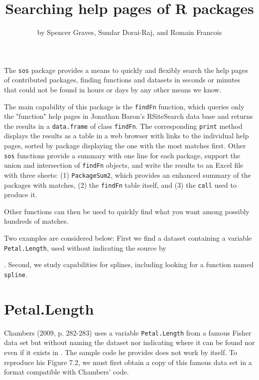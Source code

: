 \title{Searching help pages of R packages}
\author{by Spencer Graves, Sundar Dorai-Raj, and Romain Francois}

\maketitle

The {\tt sos} package provides a means to quickly and
flexibly search the help pages of contributed packages, finding
functions and datasets in seconds or minutes that could not be
found in hours or days by any other means we know.

The main capability of this package is the {\tt findFn} function,
which queries only the "function" help pages in Jonathan Baron's
RSiteSearch data base and returns the results in a {\tt data.frame}
of class {\tt findFn}.  The corresponding {\tt print} method
displays the results as a table in a web browser with links to the
individual help pages, sorted by package displaying the one with the
most matches first.  Other {\tt sos} functions provide a summary
with one line for each package, support the union and intersection
of {\tt findFn} objects, and write the results to an Excel file
with three sheets:  (1) {\tt PackageSum2}, which
provides an enhanced summary of the packages with matches, (2) the
{\tt findFn} table itself, and (3) the {\tt call} used to produce it.

Other \R{} functions can then be used to quickly find what you want
among possibly hundreds of matches.

Two examples are considered below:  First we find a dataset containing
a variable {\tt Petal.Length}, used without indicating the source
by 

\cite[pp. 282-283]{JC09}.  Second, we study \R{} capabilities
for splines, including looking for a function named {\tt spline}.

\section*{Petal.Length}

Chambers (2009, p. 282-283) uses a variable {\tt Petal.Length} from a
famous Fisher data set but without naming the dataset nor indicating
where it can be found nor even if it exists in \R{}.  The sample
code he provides does not work by itself.  To reproduce his
Figure 7.2, we must first obtain a copy of this famous data set
in a format compatible with Chambers' code.

